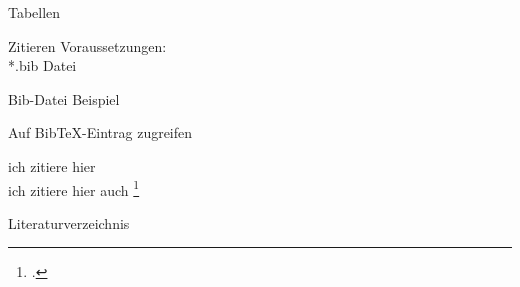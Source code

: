 \begin{frame}{Tabellen}
\begin{Code}
\centering

\end{Code}
\end{frame}

\begin{frame}{Zitieren}
Voraussetzungen:\\

*.bib Datei\\

\begin{Code}
\centering

\end{Code}

\end{frame}
\begin{frame}{Bib-Datei Beispiel}
\begin{Code}
\centering

\end{Code}
\end{frame}
\begin{frame}{Auf BibTeX-Eintrag zugreifen}
\begin{Code}
\centering

\end{Code}

ich zitiere hier \cite{braun:scala}\\
ich zitiere hier auch \footcite{braun:scala}
\end{frame}
\begin{frame}{Literaturverzeichnis}
\begin{Code}
\centering

\end{Code}
\printbibliography
\end{frame}